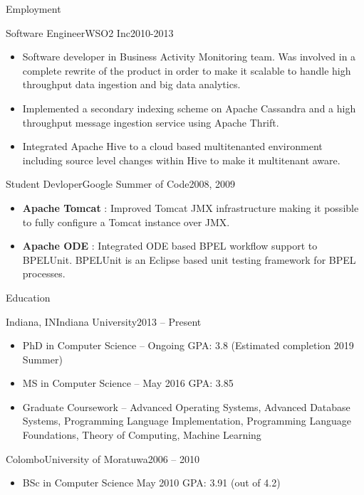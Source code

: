 \documentclass[calibri]{mcdowellcv}
\begin{document}
\begin{cvsection}{Employment}
		\begin{cvsubsection}{Software Engineer}{WSO2 Inc}{2010-2013}	
			\begin{itemize}
				\item Software developer in Business Activity Monitoring team. Was involved in a complete rewrite of the product in order to make it scalable to handle high throughput data ingestion and big data analytics.
				\item Implemented a secondary indexing scheme on Apache Cassandra and a high throughput message ingestion service using Apache Thrift.
				\item Integrated Apache Hive to a cloud based multitenanted environment including source level changes within Hive to make it multitenant aware.
			\end{itemize}
		\end{cvsubsection}
		
		\begin{cvsubsection}{Student Devloper}{Google Summer of Code}{2008, 2009}	
			\begin{itemize}
			  \item \textbf{Apache Tomcat} : Improved Tomcat JMX infrastructure making it possible to
fully configure a Tomcat instance over JMX.
			  \item \textbf{Apache ODE} : Integrated ODE based BPEL workflow support to BPELUnit. BPELUnit is an Eclipse based unit testing framework for BPEL processes.
			\end{itemize}
		\end{cvsubsection}
	\end{cvsection}
	\begin{cvsection}{Education}
		\begin{cvsubsection}{Indiana, IN}{Indiana University}{2013 -- Present}
			\begin{itemize}
			    \item PhD in Computer Science -- Ongoing GPA: 3.8 (Estimated completion 2019 Summer)
				\item MS in Computer Science -- May 2016 GPA: 3.85
				\item Graduate Coursework -- Advanced Operating Systems, Advanced Database Systems, Programming Language Implementation, Programming Language Foundations, Theory of Computing, Machine Learning
			\end{itemize}
		\end{cvsubsection}
	         \begin{cvsubsection}{Colombo}{University of Moratuwa}{2006 -- 2010}
			\begin{itemize}
				\item BSc in Computer Science May 2010 GPA: 3.91 (out of 4.2)
			\end{itemize}
		\end{cvsubsection}
	\end{cvsection}
	
\end{document}
